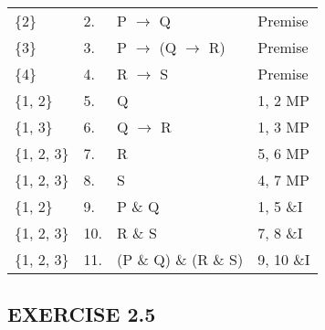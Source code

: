 \documentclass[a4paper,12pt]{article}
\newcommand{\ra}{$\rightarrow$ }
\begin{document}
\begin{enumerate}[label=\arabic*,leftmargin=*]
\begin{enumerate}[label=(\roman*)]
\begin{minipage}{\textwidth}
\begin{tabular}{l l l l}
                        \{2\} & 2. & P \ra Q & Premise\\
                        \{3\} & 3. & P \ra (Q \ra R) & Premise\\
                        \{4\} & 4. & R \ra S & Premise\\
                        \{1, 2\} & 5. & Q & 1, 2 MP\\
                        \{1, 3\} & 6. & Q \ra R & 1, 3 MP\\
                        \{1, 2, 3\} & 7. & R & 5, 6 MP\\
                        \{1, 2, 3\} & 8. & S & 4, 7 MP\\
                        \{1, 2\} & 9. & P \& Q & 1, 5 \&I\\
                        \{1, 2, 3\} & 10. & R \& S & 7, 8 \&I\\
                        \{1, 2, 3\} & 11. & (P \& Q) \& (R \& S) & 9, 10 \&I\\
                    \end{tabular}
                \end{minipage}

            \end{enumerate}

    \end{enumerate}

    \subsection*{EXERCISE 2.5}
\end{document}
